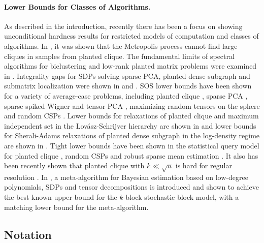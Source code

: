 \paragraph{Lower Bounds for Classes of Algorithms.} As described in the introduction, recently there has been a focus on showing unconditional hardness results for restricted models of computation and classes of algorithms. In \cite{jerrum1992large}, it was shown that the Metropolis process cannot find large cliques in samples from planted clique. The fundamental limits of spectral algorithms for biclustering and low-rank planted matrix problems were examined in \cite{montanari2015limitation}. Integrality gaps for SDPs solving sparse PCA, planted dense subgraph and submatrix localization were shown in \cite{krauthgamer2015semidefinite} and \cite{chen2016statistical}. SOS lower bounds have been shown for a variety of average-case problems, including planted clique \cite{deshpande2015improved, raghavendra2015tight, hopkins2016integrality, barak2016nearly}, sparse PCA \cite{ma2015sum}, sparse spiked Wigner and tensor PCA \cite{hopkins2017power}, maximizing random tensors on the sphere \cite{bhattiprolu2017sum} and random CSPs \cite{kothari2017sum}. Lower bounds for relaxations of planted clique and maximum independent set in the Lov\'{a}sz-Schrijver hierarchy are shown in \cite{feige2003probable} and lower bounds for Sherali-Adams relaxations of planted dense subgraph in the log-density regime are shown in \cite{chlamtac2018sherali}. Tight lower bounds have been shown in the statistical query model for planted clique \cite{feldman2013statistical}, random CSPs \cite{feldman2015complexity} and robust sparse mean estimation \cite{diakonikolas2016statistical}. It also has been recently shown that planted clique with $k \ll \sqrt{n}$ is hard for regular resolution \cite{atserias2018clique}. In \cite{hopkins2017efficient}, a meta-algorithm for Bayesian estimation based on low-degree polynomials, SDPs and tensor decompositions is introduced and shown to achieve the best known upper bound for the $k$-block stochastic block model, with a matching lower bound for the meta-algorithm.


\subsection{Notation}

